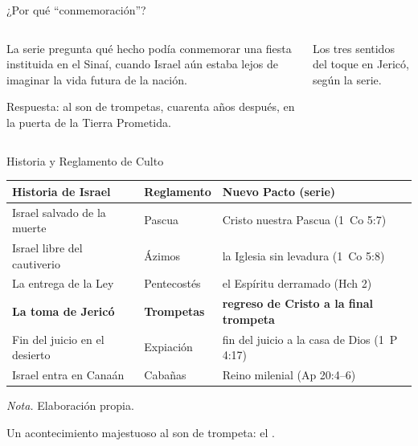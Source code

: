 \begin{frame}{¿Por qué ``conmemoración''?}
\begin{columns}[c,onlytextwidth]
\begin{column}{0.52\textwidth}\small\RaggedRight
La serie pregunta qué hecho podía conmemorar una fiesta instituida en el Sinaí, cuando Israel aún estaba lejos de imaginar la vida futura de la nación.\par\medskip
Respuesta:  al son de trompetas, cuarenta años después, en la puerta de la Tierra Prometida.
\end{column}
\begin{column}{0.46\textwidth}
\par
{\fontsize{5}{6}\selectfont\color{sepia}Los tres sentidos del toque en Jericó, según la serie.}
\end{column}
\end{columns}
\end{frame}

\begin{frame}{Historia y Reglamento de Culto}
\renewcommand{\arraystretch}{1.12}\scriptsize
\begin{tabular}{@{}L{3.1cm}L{2.2cm}L{6.3cm}@{}}
\toprule
\textbf{Historia de Israel} & \textbf{Reglamento} & \textbf{Nuevo Pacto (serie)} \\ \midrule
Israel salvado de la muerte & Pascua & Cristo nuestra Pascua (1~Co 5:7) \\
Israel libre del cautiverio & Ázimos & la Iglesia sin levadura (1~Co 5:8) \\
La entrega de la Ley & Pentecostés & el Espíritu derramado (Hch 2) \\
\textbf{La toma de Jericó} & \textbf{Trompetas} & \textbf{regreso de Cristo a la final trompeta} \\
Fin del juicio en el desierto & Expiación & fin del juicio a la casa de Dios (1~P 4:17) \\
Israel entra en Canaán & Cabañas & Reino milenial (Ap 20:4--6) \\
\bottomrule
\end{tabular}\par\medskip
{\fontsize{5}{6}\selectfont\color{sepia}\textit{Nota.} Elaboración propia.}\par\smallskip
\small\RaggedRight Un acontecimiento majestuoso al son de trompeta: el .
\end{frame}

